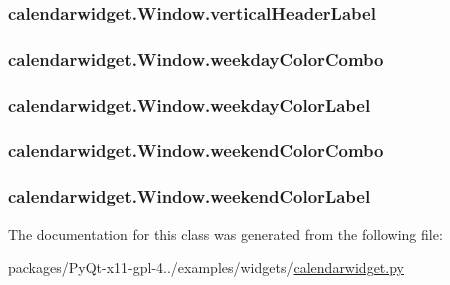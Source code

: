 \subsubsection[{vertical\+Header\+Label}]{\setlength{\rightskip}{0pt plus 5cm}calendarwidget.\+Window.\+vertical\+Header\+Label}\label{classcalendarwidget_1_1Window_ab8ac4f0ec123b9516a90856fb80143ba}
\hypertarget{classcalendarwidget_1_1Window_ad14d2e5f54bb497e0e2754971b6ad5da}{}
\subsubsection[{weekday\+Color\+Combo}]{\setlength{\rightskip}{0pt plus 5cm}calendarwidget.\+Window.\+weekday\+Color\+Combo}\label{classcalendarwidget_1_1Window_ad14d2e5f54bb497e0e2754971b6ad5da}
\hypertarget{classcalendarwidget_1_1Window_a975f7824b2067f0140b4a84dd4ab9065}{}
\subsubsection[{weekday\+Color\+Label}]{\setlength{\rightskip}{0pt plus 5cm}calendarwidget.\+Window.\+weekday\+Color\+Label}\label{classcalendarwidget_1_1Window_a975f7824b2067f0140b4a84dd4ab9065}
\hypertarget{classcalendarwidget_1_1Window_ac61cc58bbc42119f28928fb9185375f2}{}
\subsubsection[{weekend\+Color\+Combo}]{\setlength{\rightskip}{0pt plus 5cm}calendarwidget.\+Window.\+weekend\+Color\+Combo}\label{classcalendarwidget_1_1Window_ac61cc58bbc42119f28928fb9185375f2}
\hypertarget{classcalendarwidget_1_1Window_ab756f592f05dd37b78105b55b21166b8}{}
\subsubsection[{weekend\+Color\+Label}]{\setlength{\rightskip}{0pt plus 5cm}calendarwidget.\+Window.\+weekend\+Color\+Label}\label{classcalendarwidget_1_1Window_ab756f592f05dd37b78105b55b21166b8}


The documentation for this class was generated from the following file\+:\begin{DoxyCompactItemize}
\item 
packages/\+Py\+Qt-\/x11-\/gpl-\/4../examples/widgets/\hyperlink{calendarwidget_8py}{calendarwidget.\+py}\end{DoxyCompactItemize}
